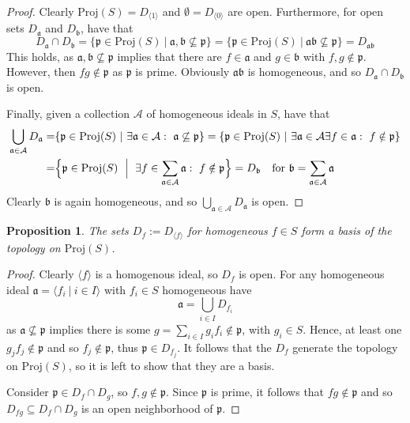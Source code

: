 \documentclass{scrartcl}
\newcommand{\p}{\mathfrak{p}}
\renewcommand{\a}{\mathfrak{a}}
\renewcommand{\b}{\mathfrak{b}}
\newcommand{\Proj}{\mathrm{Proj}}
\newtheorem{prop}{Proposition}
\theoremstyle{definition}
\begin{document}
\begin{proof}
    Clearly $\Proj(S) = D_{\langle 1 \rangle}$ and $\emptyset = D_{\langle 0 \rangle}$ are open.
    Furthermore, for open sets $D_\a$ and $D_\b$, have that
    \begin{equation*}
        D_\a \cap D_\b = \{ \p \in \Proj(S) \ | \ \a, \b \not\subseteq \p \} = \{ \p \in \Proj(S) \ | \ \a\b \not\subseteq \p \} = D_{\a\b}
    \end{equation*}
    This holds, as $\a, \b \not\subseteq \p$ implies that there are $f \in \a$ and $g \in \b$ with $f, g \notin \p$.
    However, then $fg \notin \p$ as $\p$ is prime.
    Obviously $\a\b$ is homogeneous, and so $D_\a \cap D_\b$ is open.

    Finally, given a collection $\mathcal{A}$ of homogeneous ideals in $S$, have that
    \begin{align*}
        \bigcup_{\a \in \mathcal{A}} D_\a =& \{ \p \in \Proj(S) \ | \ \exists \a \in \mathcal{A}:\ \a \not\subseteq \p \} = \{ \p \in \Proj(S) \ | \ \exists \a \in \mathcal{A} \exists f \in \a:\ f \notin \p \} \\
        =& \Bigl\{ \p \in \Proj(S) \ \Bigm| \ \exists f \in \sum_{\a \in \mathcal{A}} \a:\ f \notin \p \Bigr\} = D_{\b} \quad \text{for $\b = \sum_{\a \in \mathcal{A}} \a$}
    \end{align*}
    Clearly $\b$ is again homogeneous, and so $\bigcup_{\a \in \mathcal{A}} D_\a$ is open.
\end{proof}
\begin{prop}
    The sets $D_f := D_{\langle f \rangle}$ for homogeneous $f \in S$ form a basis of the topology on $\Proj(S)$.
\end{prop}
\begin{proof}
    Clearly $\langle f \rangle$ is a homogenous ideal, so $D_f$ is open.
    For any homogeneous ideal $\a = \langle f_i \ | \ i \in I \rangle$ with $f_i \in S$ homogeneous have
    \begin{equation*}
        \a = \bigcup_{i \in I} D_{f_i}
    \end{equation*}
    as $\a \not\subseteq \p$ implies there is some $g = \sum_{i \in I} g_i f_i \notin \p$, with $g_i \in S$.
    Hence, at least one $g_j f_j \notin \p$ and so $f_j \notin \p$, thus $\p \in D_{f_j}$.
    It follows that the $D_f$ generate the topology on $\Proj(S)$, so it is left to show that they are a basis.

    Consider $\p \in D_f \cap D_g$, so $f, g \notin \p$.
    Since $\p$ is prime, it follows that $fg \notin \p$ and so $D_{fg} \subseteq D_f \cap D_g$ is an open neighborhood of $\p$.
\end{proof}
\end{document}

